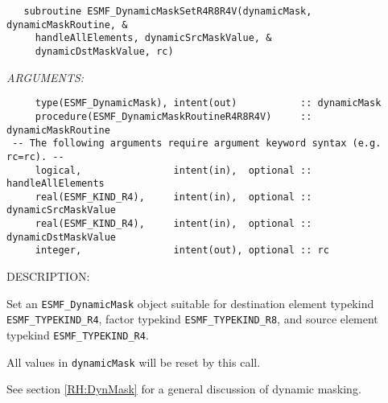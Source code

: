 \begin{verbatim}   subroutine ESMF_DynamicMaskSetR4R8R4V(dynamicMask, dynamicMaskRoutine, &
     handleAllElements, dynamicSrcMaskValue, &
     dynamicDstMaskValue, rc)\end{verbatim}{\em ARGUMENTS:}
\begin{verbatim}     type(ESMF_DynamicMask), intent(out)           :: dynamicMask
     procedure(ESMF_DynamicMaskRoutineR4R8R4V)     :: dynamicMaskRoutine
 -- The following arguments require argument keyword syntax (e.g. rc=rc). --
     logical,                intent(in),  optional :: handleAllElements
     real(ESMF_KIND_R4),     intent(in),  optional :: dynamicSrcMaskValue
     real(ESMF_KIND_R4),     intent(in),  optional :: dynamicDstMaskValue
     integer,                intent(out), optional :: rc
           \end{verbatim}
{\sf DESCRIPTION:\\ }


     \label{api:DynamicMaskSetR4R8R4V}
     Set an {\tt ESMF\_DynamicMask} object suitable for 
     destination element typekind {\tt ESMF\_TYPEKIND\_R4},
     factor typekind {\tt ESMF\_TYPEKIND\_R8}, and
     source element typekind {\tt ESMF\_TYPEKIND\_R4}.
     
     All values in {\tt dynamicMask} will be reset by this call.
  
     See section \ref{RH:DynMask} for a general discussion of dynamic masking.
  
